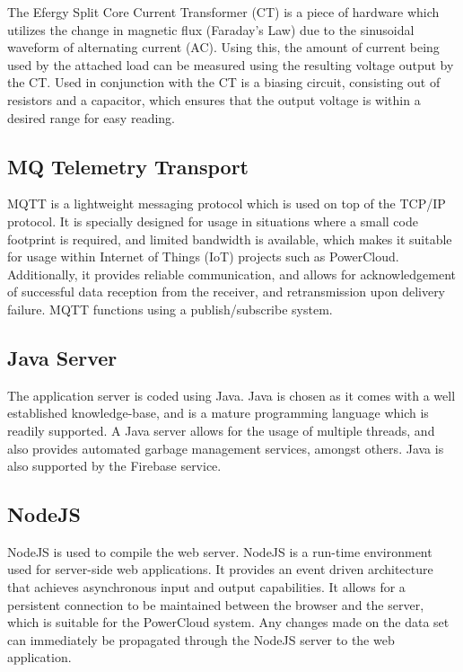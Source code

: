 \documentclass{article}
\begin{document}
	The Efergy Split Core Current Transformer (CT) is a piece of hardware 
	which utilizes the change in magnetic flux (Faraday's Law) due to the 
	sinusoidal waveform of alternating current (AC). Using this, the 
	amount of current being used by the attached load can be measured 
	using the resulting voltage output by the CT. Used in conjunction 
	with the CT is a biasing circuit, consisting out of resistors and a 
	capacitor, which ensures that the output voltage is within a desired 
	range for easy reading.
	
	
	\subsection{MQ Telemetry Transport}
	
	MQTT is a lightweight messaging protocol which is used on top of the 
	TCP/IP protocol. It is specially designed for usage in situations 
	where a small code footprint is required, and limited bandwidth is 
	available, which makes it suitable for usage within Internet of 
	Things (IoT) projects such as PowerCloud. Additionally, it provides 
	reliable communication, and allows for acknowledgement of successful 
	data reception from the receiver, and retransmission upon delivery 
	failure. MQTT functions using a publish/subscribe system.
	
	\subsection{Java Server}
	
	The application server is coded using Java. Java is chosen as it 
	comes with a well established knowledge-base, and is a mature 
	programming language which is readily supported. A Java server allows 
	for the usage of multiple threads, and also provides automated 
	garbage management services, amongst others. Java is also supported 
	by the Firebase service.
	
	\subsection{NodeJS}
	
	NodeJS is used to compile the web server. NodeJS is a run-time 
	environment used for server-side web applications. It provides an 
	event driven architecture that achieves asynchronous input and output 
	capabilities. It allows for a  persistent connection to be maintained 
	between the browser and the server, which is suitable for the 
	PowerCloud system. Any changes made on the data set can immediately 
	be propagated through the NodeJS server to the web application.
	
\end{document}
